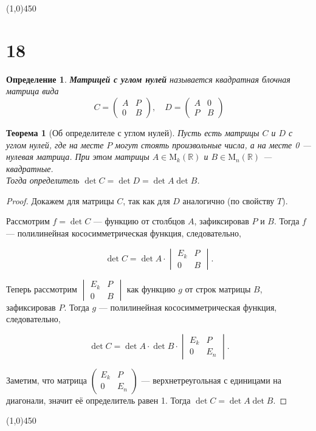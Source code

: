 \documentclass[a4paper,12pt]{article}
\newcommand{\M}{\mathrm{M}}
\newtheorem*{definition}{Определение}
\newtheorem*{theorem}{Теорема}
\begin{document}
	\begin{center}
		\line(1,0){450}
	\end{center}
	
	\section*{18}
	\begin{definition}
		\textbf{Матрицей с углом нулей} называется квадратная блочная матрица вида
		\[
		C =
		\begin{pmatrix}
		A & P\\
		0 & B
		\end{pmatrix},
		\quad
		D =
		\begin{pmatrix}
		A & 0\\
		P & B
		\end{pmatrix}
		\]
	\end{definition}
	\begin{theorem}[Об определителе с углом нулей]
		Пусть есть матрицы $C$ и $D$ с углом нулей, где на месте $P$ могут стоять произвольные числа, а на месте 0 --- нулевая матрица. При этом матрицы $A \in \M_k\left(\mathbb R\right)$ и $B \in \M_n\left(\mathbb R\right)$ — квадратные. \\Тогда определитель $\det{C} = \det{D} = \det{A}\det{B}$.
	\end{theorem}
	\begin{proof}
		Докажем для матрицы $C$, так как для $D$ аналогично (по свойству $T$).
		
		Рассмотрим $f = \det{C}$ --- функцию от столбцов $A$, зафиксировав $P$ и $B$. Тогда $f$ --- полилинейная кососимметрическая функция, следовательно,
		
		$$\det{C} = \det{A} \cdot 
		\begin{vmatrix}
		E_k & P\\
		0 & B
		\end{vmatrix}.$$
		
		Теперь рассмотрим 
		$\begin{vmatrix}
		E_k & P\\
		0 & B
		\end{vmatrix}$ как функцию $g$ от строк матрицы $B$, зафиксировав $P$. Тогда $g$ --- полилинейная кососимметрическая функция, следовательно,
		
		$$\det{C} = \det{A} \cdot \det{B} \cdot
		\begin{vmatrix}
		E_k & P\\
		0 & E_n
		\end{vmatrix}.$$
		
		Заметим, что матрица
		$\begin{pmatrix}
		E_k & P\\
		0 & E_n
		\end{pmatrix}$ --- верхнетреугольная с единицами на диагонали, значит её определитель равен 1. Тогда $\det{C} = \det{A}\det{B}$.
	\end{proof}
	\begin{center}
		\line(1,0){450}
	\end{center}
\end{document}
